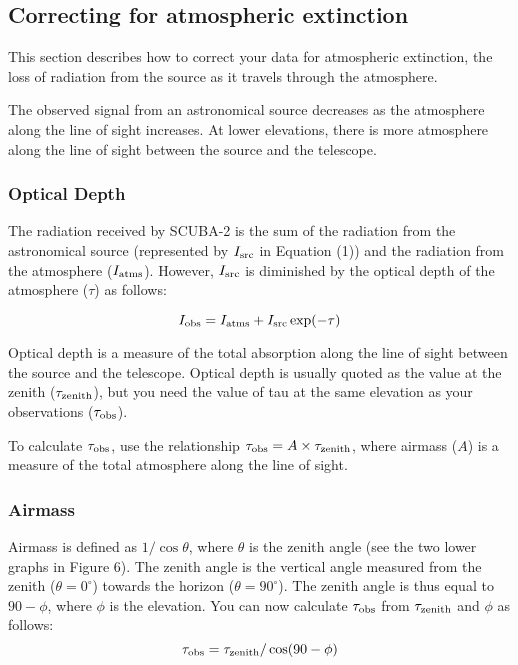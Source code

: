 \documentclass[twoside,11pt]{article}
\renewcommand{\_}{\texttt{\symbol{95}}}
\begin{document}
\subsection{Correcting for atmospheric extinction}

This section describes how to correct your data for atmospheric
extinction, the loss of radiation from the source as it travels
through the atmosphere.

The observed signal from an astronomical source decreases as the
atmosphere along the line of sight increases. At lower elevations,
there is more atmosphere along the line of sight between the source
and the telescope.

\subsubsection{Optical Depth}

The radiation received by SCUBA-2 is the sum of the radiation from the
astronomical source (represented by $I_{\rm src}$ in Equation (1)) and
the radiation from the atmosphere ($I_{\rm atms}$). However, $I_{\rm
    src}$ is diminished by the optical depth of the atmosphere
  ($\tau$) as follows:

\begin{equation}
I_{\rm obs} = I_{\rm atms} + I_{\rm src} \exp(-\tau)
\end{equation}

Optical depth is a measure of the total absorption along the line of
sight between the source and the telescope. Optical depth is usually
quoted as the value at the zenith ($\tau_{\rm zenith}$), but you need
the value of tau at the same elevation as your observations
($\tau_{\rm obs}$).

To calculate $\tau_{\rm obs}$, use the relationship $\tau_{\rm obs} =
A \times \tau_{\rm zenith}$, where airmass ($A$) is a measure of the
total atmosphere along the line of sight.

\subsubsection{Airmass}

Airmass is defined as $1 / \cos \theta$, where $\theta$ is the zenith
angle (see the two lower graphs in Figure 6). The zenith angle is the
vertical angle measured from the zenith ($\theta = 0^\circ$) towards
the horizon ($\theta = 90^\circ$). The zenith angle is thus equal to
$90-\phi$, where $\phi$ is the elevation. You can now calculate
$\tau_{\rm obs}$ from $\tau_{\rm zenith}$ and $\phi$ as follows:
\begin{equation}
\tau_{\rm obs} = \tau_{\rm zenith} / \cos(90 - \phi )
\end{equation}
\end{document}

